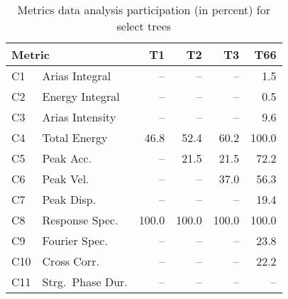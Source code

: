 
\begin{table}[t]
	\centering
	\caption{Metrics data analysis participation (in percent) for select trees }
	\label{tab:participation}
	\small
	\begin{tabular}{llrrrr}
	\multicolumn{2}{l}{Metric} 	& T1 	& T2	& T3 	& T66 	\\ 
	\hline
	C1 		& Arias Integral	& --	& --	& -- 	& 1.5	\\
	C2 		& Energy Integral	& -- 	& --	& -- 	& 0.5	\\
	C3 		& Arias Intensity	& -- 	& -- 	& -- 	& 9.6	\\
	\rowcolor{light-light-gray}
	C4 		& Total Energy		& 46.8	& 52.4	& 60.2	& 100.0	\\
	\rowcolor{light-light-gray}
	C5 		& Peak Acc.			& -- 	& 21.5	& 21.5	& 72.2	\\
	\rowcolor{light-light-gray}
	C6 		& Peak Vel.			& -- 	& -- 	& 37.0	& 56.3	\\
	C7 		& Peak Disp.		& -- 	& -- 	& -- 	& 19.4	\\
	\rowcolor{light-light-gray}
	C8 		& Response Spec.	& 100.0	& 100.0	& 100.0	& 100.0	\\
	C9 		& Fourier Spec.		& -- 	& -- 	& --	& 23.8	\\
	C10		& Cross Corr.		& -- 	& -- 	& -- 	& 22.2	\\
	C11		& Strg.~Phase Dur.	& -- 	& -- 	& -- 	& -- 	\\
	\hline
	\end{tabular}
\end{table}


